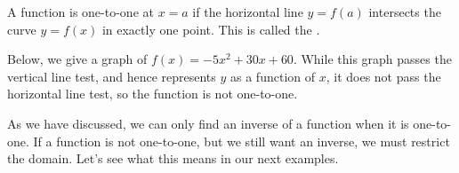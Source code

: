 \documentclass{ximera}
\begin{document}
\begin{theorem}
  A function is one-to-one at $x=a$ if the horizontal line $y = f(a)$
  intersects the curve $y=f(x)$ in exactly one point. This is called
  the .
\end{theorem}
Below, we give a graph of $f(x)=-5x^2+30x+60$. While this graph passes
the vertical line test, and hence represents $y$ as a function of $x$,
it does not pass the horizontal line test, so the function is not
one-to-one.
\begin{image}
\end{image}

As we have discussed, we can only find an inverse of a function when
it is one-to-one.  If a function is not one-to-one, but we still want
an inverse, we must restrict the domain. Let's see what this means in
our next examples.
\end{document}
